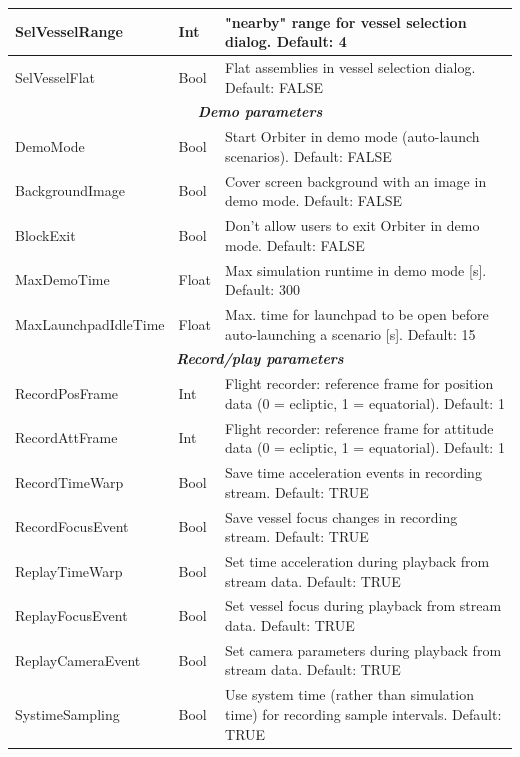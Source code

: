 \documentclass[Orbiter User Manual.tex]{subfiles}
\begin{document}
\begin{longtable}{ |p{}|p{}|p{}| }
	\hline\rule{0pt}{2ex}
	SelVesselRange & Int & "nearby" range for vessel selection dialog. Default: 4\\
	\hline\rule{0pt}{2ex}
	SelVesselFlat & Bool & Flat assemblies in vessel selection dialog. Default: FALSE\\
	\hline
	\multicolumn{3}{|c|}{\rule{0pt}{2ex}\textbf{\textit{Demo parameters}}}\\
	\hline\rule{0pt}{2ex}
	DemoMode & Bool & Start Orbiter in demo mode (auto-launch scenarios). Default: FALSE\\
	\hline\rule{0pt}{2ex}
	BackgroundImage & Bool & Cover screen background with an image in demo mode. Default: FALSE\\
	\hline\rule{0pt}{2ex}
	BlockExit & Bool & Don't allow users to exit Orbiter in demo mode. Default: FALSE\\
	\hline\rule{0pt}{2ex}
	MaxDemoTime & Float & Max simulation runtime in demo mode [s]. Default: 300\\
	\hline\rule{0pt}{2ex}
	MaxLaunchpadIdleTime & Float & Max. time for launchpad to be open before auto-launching a scenario [s]. Default: 15\\
	\hline
	\multicolumn{3}{|c|}{\rule{0pt}{2ex}\textbf{\textit{Record/play parameters}}}\\
	\hline\rule{0pt}{2ex}
	RecordPosFrame & Int & Flight recorder: reference frame for position data (0 = ecliptic, 1 = equatorial). Default: 1\\
	\hline\rule{0pt}{2ex}
	RecordAttFrame & Int & Flight recorder: reference frame for attitude data (0 = ecliptic, 1 = equatorial). Default: 1\\
	\hline\rule{0pt}{2ex}
	RecordTimeWarp & Bool & Save time acceleration events in recording stream. Default: TRUE\\
	\hline\rule{0pt}{2ex}
	RecordFocusEvent & Bool & Save vessel focus changes in recording stream. Default: TRUE\\
	\hline\rule{0pt}{2ex}
	ReplayTimeWarp & Bool & Set time acceleration during playback from stream data. Default: TRUE\\
	\hline\rule{0pt}{2ex}
	ReplayFocusEvent & Bool & Set vessel focus during playback from stream data. Default: TRUE\\
	\hline\rule{0pt}{2ex}
	ReplayCameraEvent & Bool & Set camera parameters during playback from stream data. Default: TRUE\\
	\hline\rule{0pt}{2ex}
	SystimeSampling & Bool & Use system time (rather than simulation time) for recording sample intervals. Default: TRUE\\

\end{longtable}
\end{document}
